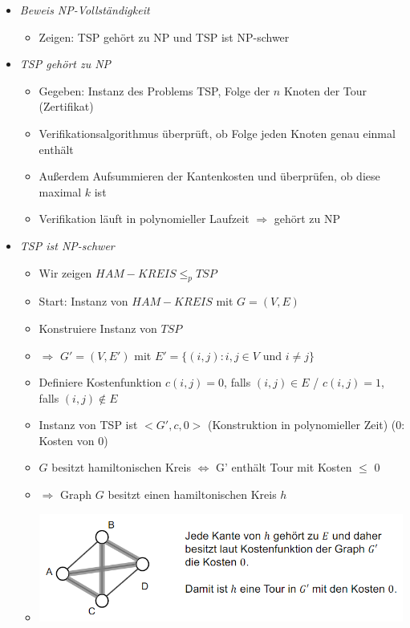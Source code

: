 \documentclass[
    12pt,
    a4paper,
    ngerman,
    color=3b,%
    marginpar=false,
    colorback=false,
    leqno,
]{tudaexercise}
\begin{document}
\begin{itemize}
\begin{itemize}
\begin{itemize}
                    \end{itemize}
              \item \textit{Beweis NP-Vollständigkeit}
                    \begin{itemize}
                        \item Zeigen: TSP gehört zu NP und TSP ist NP-schwer
                    \end{itemize}
              \item \textit{TSP gehört zu NP}
                    \begin{itemize}
                        \item Gegeben: Instanz des Problems TSP, Folge der $n$ Knoten der Tour (Zertifikat)
                        \item Verifikationsalgorithmus überprüft, ob Folge jeden Knoten genau einmal enthält
                        \item Außerdem Aufsummieren der Kantenkosten und überprüfen, ob diese maximal $k$ ist
                        \item Verifikation läuft in polynomieller Laufzeit $\Rightarrow$ gehört zu NP
                    \end{itemize}
                    \clearpage
              \item \textit{TSP ist NP-schwer}
                    \begin{itemize}
                        \item Wir zeigen $HAM-KREIS \leq_p TSP$
                        \item Start: Instanz von $HAM-KREIS$ mit $G=(V,E)$
                        \item Konstruiere Instanz von $TSP$
                        \item[] $\Rightarrow$ $G'=(V,E')$ mit $E'=\{(i,j):i,j \in V$ und $i\neq j\}$
                        \item Definiere Kostenfunktion $c(i,j) = 0$, falls $(i,j) \in E$ / $c(i,j)=1$, falls $(i,j) \notin E$
                        \item Instanz von TSP ist $<G', c, 0>$ (Konstruktion in polynomieller Zeit) (0: Kosten von 0)
                        \item {} $G$ besitzt hamiltonischen Kreis $\Leftrightarrow$ G' enthält Tour mit Kosten $\leq$ 0
                        \item $\Rightarrow$ Graph $G$ besitzt einen hamiltonischen Kreis $h$
                        \item[] \includegraphics[width=12cm]{pictures/schwer1.PNG}

\end{itemize}
\end{itemize}
\end{itemize}
\end{document}
